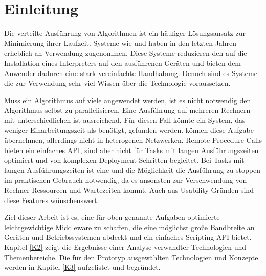 
\chapter{Einleitung}
\label{K1}



Die verteilte Ausführung von Algorithmen ist ein häufiger Lösungsansatz zur Minimierung ihrer Laufzeit.
Systeme wie \MapReduce{} und \ApacheSpark{} haben in den letzten Jahren erheblich an Verwendung zugenommen.
Diese Systeme reduzieren den \DeploymentAufwand{} auf die Installation eines Interpreters auf den ausführenen Geräten und bieten dem Anwender dadurch eine stark vereinfachte Handhabung.
Denoch sind es Systeme die zur Verwendung sehr viel Wissen über die Technologie voraussetzen.

Muss ein Algorithmus auf viele \InputDateien{} angewendet werden, ist es nicht notwendig den Algorithmus selbst zu parallelisieren.
Eine Ausführung auf mehreren Rechnern mit unterschiedlichen \InputDateien{} ist ausreichend.
Für diesen Fall könnte ein System, das weniger Einarbeitungszeit als \ApacheSpark{} benötigt, gefunden werden.
\ShellScripts{} können diese Aufgabe übernehmen, allerdings nicht in heterogenen Netzwerken.
Remote Procedure Calls bieten ein einfaches API, sind aber nicht für Tasks mit langen Ausführungszeiten optimiert und von komplexen Deployment Schritten begleitet.
Bei Tasks mit langen Ausführungszeiten ist eine \ProgressAnzeige{} und die Möglichkeit die Ausführung zu stoppen im praktischen Gebrauch notwendig, da es ansonsten zur Verschwendung von Rechner-Ressourcen und Wartezeiten kommt.
Auch aus Usability Gründen sind diese Features wünschenswert.

Ziel dieser Arbeit ist es, eine für oben genannte Aufgaben optimierte leichtgewichtige Middleware zu schaffen, die eine möglichst große Bandbreite an Geräten und Betriebssystemen abdeckt und ein einfaches Scripting API bietet.
Kapitel \ref{K2} zeigt die Ergebnisse einer Analyse verwandter Technologien und Themenbereiche.
Die für den Prototyp ausgewählten Technologien und Konzepte werden in Kapitel \ref{K3} aufgelistet und begründet.

